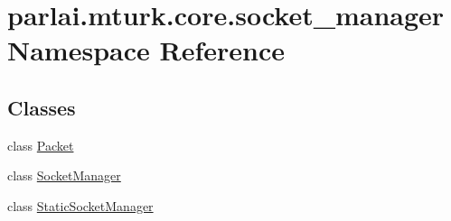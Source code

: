 \hypertarget{namespaceparlai_1_1mturk_1_1core_1_1socket__manager}{}\section{parlai.\+mturk.\+core.\+socket\+\_\+manager Namespace Reference}
\label{namespaceparlai_1_1mturk_1_1core_1_1socket__manager}
\subsection*{Classes}
\begin{DoxyCompactItemize}
\item 
class \hyperlink{classparlai_1_1mturk_1_1core_1_1socket__manager_1_1Packet}{Packet}
\item 
class \hyperlink{classparlai_1_1mturk_1_1core_1_1socket__manager_1_1SocketManager}{Socket\+Manager}
\item 
class \hyperlink{classparlai_1_1mturk_1_1core_1_1socket__manager_1_1StaticSocketManager}{Static\+Socket\+Manager}
\end{DoxyCompactItemize}
